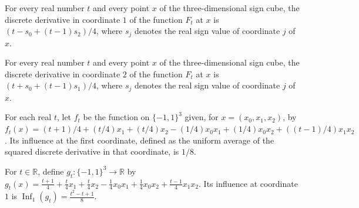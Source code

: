 \begin{theorem}
\label{FABL.discreteDerivative_osssCounterexampleAt_one}
\leanok
{}
For every real number $t$ and every point $x$ of the three-dimensional sign cube, the
discrete derivative in coordinate $1$ of the function $F_t$ at $x$ is
$(t-s_0+(t-1)s_2)/4$, where $s_j$ denotes the real sign value of coordinate $j$ of $x$.
\end{theorem}

\begin{theorem}
\label{FABL.discreteDerivative_osssCounterexampleAt_two}
\leanok
{}
For every real number $t$ and every point $x$ of the three-dimensional sign cube, the
discrete derivative in coordinate $2$ of the function $F_t$ at $x$ is
$(t+s_0+(t-1)s_1)/4$, where $s_j$ denotes the real sign value of coordinate $j$ of $x$.
\end{theorem}

\begin{theorem}
\label{FABL.influence_osssCounterexampleAt_zero}
\leanok
{}
For each real $t$, let $f_t$ be the function on $\{−1,1\}^3$ given, for
$x=(x_0,x_1,x_2)$, by
$f_t(x)=(t+1)/4+(t/4)x_1+(t/4)x_2-(1/4)x_0x_1+(1/4)x_0x_2+((t-1)/4)x_1x_2$. Its
influence at the first coordinate, defined as the uniform average of the squared
discrete derivative in that coordinate, is $1/8$.
\end{theorem}

\begin{theorem}
\label{FABL.influence_osssCounterexampleAt_one}
\leanok
{}
For $t\in\mathbb{R}$, define $g_t:\{-1,1\}^3\to\mathbb{R}$ by
$g_t(x)=\frac{t+1}{4}+\frac{t}{4}x_1+\frac{t}{4}x_2-\frac14x_0x_1+\frac14x_0x_2+\frac{t-1}{4}x_1x_2$.
Its influence at coordinate $1$ is $\operatorname{Inf}_1(g_t)=\frac{t^2-t+1}{8}$.
\end{theorem}

